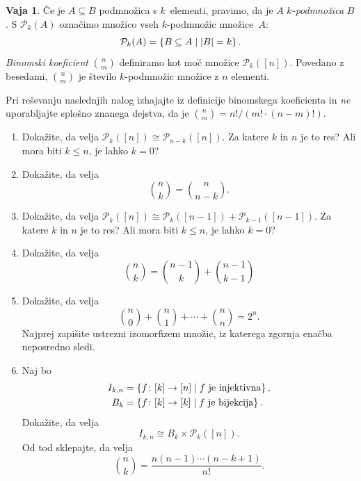 \documentclass{article}
\newcommand{\pow}{\mathcal{P}}
\theoremstyle{definition}
\newtheorem{vaja}{Vaja}
\begin{document}
\begin{vaja}
  Če je $A \subseteq B$ podmnožica s $k$~elementi, pravimo, da je $A$ \emph{$k$-podmnožica} $B$.
  S $\pow_k(A)$ označimo množico vseh $k$-podmnožic množice~$A$:
  \begin{equation*}
    \pow_k(A) = \set{B \subseteq A}{|B| = k}.
  \end{equation*}
  \emph{Binomski koeficient} $n \choose m$ definiramo kot moč množice $\pow_k([n])$. Povedano z besedami, $n \choose m$ je število $k$-podmnožic množice z $n$ elementi.
  
  Pri reševanju naslednjih nalog izhajajte iz definicije binomskega koeficienta in \emph{ne} uporabljajte splošno znanega dejstva, da je ${n \choose m} = n!/(m! \cdot (n - m)!)$.
  \begin{enumerate}
    \item
      Dokažite, da velja $\pow_k([n]) \cong \pow_{n - k}([n])$. Za katere $k$ in $n$ je to res? Ali mora biti $k \leq n$, je lahko $k = 0$?
    \item
      Dokažite, da velja
      \begin{equation*}
        {n \choose k} = {n \choose n - k}.
      \end{equation*}
    \item
      Dokažite, da velja $\pow_k([n]) \cong \pow_k([n-1]) + \pow_{k-1}([n-1])$. Za katere $k$ in $n$ je to res? Ali mora biti $k \leq n$, je lahko $k = 0$?
    \item
      Dokažite, da velja
      \begin{equation*}
        {n \choose k} = {n - 1 \choose k} + {n - 1 \choose k - 1}
      \end{equation*}
    \item
      Dokažite, da velja
      \begin{equation*}
        {n \choose 0} + {n \choose 1} + \cdots + {n \choose n} = 2^n.
      \end{equation*}
      Najprej zapišite ustrezni izomorfizem množic, iz katerega zgornja enačba neposredno sledi.
    \item
      Naj bo
      \begin{align*}
        I_{k,n} &= \set{f\colon [k] \to [n]}{\text{$f$ je injektivna}},\\
        B_k &= \set{f\colon [k] \to [k]}{\text{$f$ je bijekcija}}.
      \end{align*}
      Dokažite, da velja
      \begin{equation*}
        I_{k,n} \cong B_k \times \pow_k([n]).
      \end{equation*}
      Od tod sklepajte, da velja
      \begin{equation*}
         {n \choose k} = \frac{n (n-1) \cdots (n - k +1)}{n!}.
      \end{equation*}
  \end{enumerate}
\end{vaja}
\end{document}
